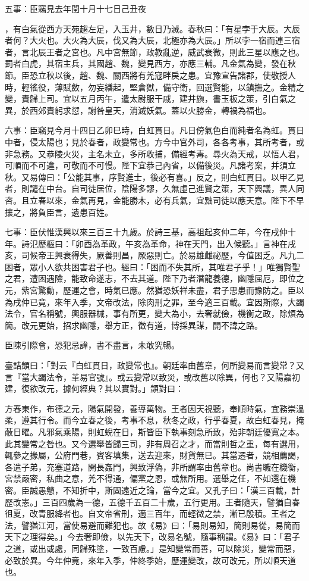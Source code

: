 \begin{pinyinscope}
五事：臣竊見去年閏十月十七日己丑夜

，有白氣從西方天苑趨左足，入玉井，數日乃滅。春秋曰：「有星孛于大辰。大辰者何？大火也。大火為大辰，伐又為大辰，北極亦為大辰。」所以孛一宿而連三宿者，言北辰王者之宮也。凡中宮無節，政教亂逆，威武衰微，則此三星以應之也。罰者白虎，其宿主兵，其國趙、魏，變見西方，亦應三輔。凡金氣為變，發在秋節。臣恐立秋以後，趙、魏、關西將有羌寇畔戾之患。宜豫宣告諸郡，使敬授人時，輕徭役，薄賦斂，勿妄繕起，堅倉獄，備守衛，回選賢能，以鎮撫之。金精之變，責歸上司。宜以五月丙午，遣太尉服干戚，建井旟，書玉板之策，引白氣之異，於西郊責躬求愆，謝咎皇天，消滅妖氣。蓋以火勝金，轉禍為福也。

六事：臣竊見今月十四日乙卯巳時，白虹貫日。凡日傍氣色白而純者名為虹。貫日中者，侵太陽也；見於春者，政變常也。方今中官外司，各各考事，其所考者，或非急務。又恭陵火災，主名未立，多所收捕，備經考毒。尋火為天戒，以悟人君，可順而不可違，可敬而不可慢。陛下宜恭己內省，以備後災。凡諸考案，并須立秋。又易傳曰：「公能其事，序賢進士，後必有喜。」反之，則白虹貫日。以甲乙見者，則譴在中台。自司徒居位，陰陽多謬，久無虛己進賢之策，天下興議，異人同咨。且立春以來，金氣再見，金能勝木，必有兵氣，宜黜司徒以應天意。陛下不早攘之，將負臣言，遺患百姓。

七事：臣伏惟漢興以來三百三十九歲。於詩三基，高祖起亥仲二年，今在戌仲十年。詩氾歷樞曰：「卯酉為革政，午亥為革命，神在天門，出入候聽。」言神在戌亥，司候帝王興衰得失，厥善則昌，厥惡則亡。於易雄雌祕歷，今值困乏。凡九二困者，眾小人欲共困害君子也。經曰：「困而不失其所，其唯君子乎！」唯獨賢聖之君，遭困遇險，能致命遂志，不去其道。陛下乃者潛龍養德，幽隱屈厄，即位之元，紫宮驚動，歷運之會，時氣已應。然猶恐妖祥未盡，君子思患而豫防之。臣以為戌仲已竟，來年入季，文帝改法，除肉刑之罪，至今適三百載。宜因斯際，大蠲法令，官名稱號，輿服器械，事有所更，變大為小，去奢就儉，機衡之政，除煩為簡。改元更始，招求幽隱，舉方正，徵有道，博採異謀，開不諱之路。

臣陳引際會，恐犯忌諱，書不盡言，未敢究暢。

臺詰顗曰：「對云『白虹貫日，政變常也』。朝廷率由舊章，何所變易而言變常？又言『當大蠲法令，革易官號』。或云變常以致災，或改舊以除異，何也？又陽嘉初建，復欲改元，據何經典？其以實對。」顗對曰：

方春東作，布德之元，陽氣開發，養導萬物。王者因天視聽，奉順時氣，宜務崇溫柔，遵其行令。而今立春之後，考事不息，秋冬之政，行乎春夏，故白虹春見，掩蔽日曜。凡邪氣乘陽，則虹蜺在日，斯皆臣下執事刻急所致，殆非朝廷優寬之本。此其變常之咎也。又今選舉皆歸三司，非有周召之才，而當則哲之重，每有選用，輒參之掾屬，公府門巷，賓客填集，送去迎來，財貨無已。其當遷者，競相薦謁，各遣子弟，充塞道路，開長姦門，興致浮偽，非所謂率由舊章也。尚書職在機衡，宮禁嚴密，私曲之意，羌不得通，偏黨之恩，或無所用。選舉之任，不如還在機密。臣誠愚戇，不知折中，斯固遠近之論，當今之宜。又孔子曰：「漢三百載，計歷改憲。」三百四歲為一德，五德千五百二十歲，五行更用。王者隨天，譬猶自春徂夏，改青服絳者也。自文帝省刑，適三百年，而輕微之禁，漸已殷積。王者之法，譬猶江河，當使易避而難犯也。故《易》曰：「易則易知，簡則易從，易簡而天下之理得矣。」今去奢即儉，以先天下，改易名號，隨事稱謂。《易》曰：「君子之道，或出或處，同歸殊塗，一致百慮。」是知變常而善，可以除災，變常而惡，必致於異。今年仲竟，來年入季，仲終季始，歷運變改，故可改元，所以順天道也。


\end{pinyinscope}
